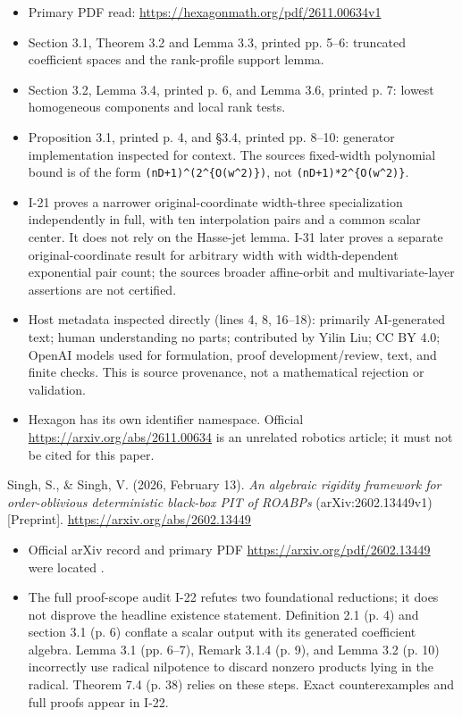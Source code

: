 \documentclass[11pt,a4paper]{article}
\providecommand{\tightlist}{\setlength{\itemsep}{0pt}\setlength{\parskip}{0pt}}
\theoremstyle{definition}\newtheorem{definition}{Definition}
\begin{document}
\begin{itemize}
\tightlist
\item
  Primary PDF read: \url{https://hexagonmath.org/pdf/2611.00634v1}
\item
  Section 3.1, Theorem 3.2 and Lemma 3.3, printed pp. 5--6: truncated
  coefficient spaces and the rank-profile support lemma.
\item
  Section 3.2, Lemma 3.4, printed p. 6, and Lemma 3.6, printed p. 7:
  lowest homogeneous components and local rank tests.
\item
  Proposition 3.1, printed p. 4, and §3.4, printed pp. 8--10: generator
  implementation inspected for context. The source\textquotesingle s
  fixed-width polynomial bound is of the form
  \texttt{(nD+1)\^{}(2\^{}\{O(w\^{}2)\})}, not
  \texttt{(nD+1)*2\^{}\{O(w\^{}2)\}}.
\item
  I-21 proves a narrower original-coordinate width-three specialization
  independently in full, with ten interpolation pairs and a common
  scalar center. It does not rely on the Hasse-jet lemma. I-31 later
  proves a separate original-coordinate result for arbitrary width with
  width-dependent exponential pair count; the source\textquotesingle s
  broader affine-orbit and multivariate-layer assertions are not
  certified.
\item
  Host metadata inspected directly (lines 4, 8, 16--18): primarily
  AI-generated text; human understanding no parts; contributed by Yilin
  Liu; CC BY 4.0; OpenAI models used for formulation, proof
  development/review, text, and finite checks. This is source
  provenance, not a mathematical rejection or validation.
\item
  Hexagon has its own identifier namespace. Official
  \url{https://arxiv.org/abs/2611.00634} is an unrelated robotics
  article; it must not be cited for this paper.
\end{itemize}

Singh, S., \& Singh, V. (2026, February 13). \emph{An algebraic rigidity
framework for order-oblivious deterministic black-box PIT of ROABPs}
(arXiv:2602.13449v1) {[}Preprint{]}.
\url{https://arxiv.org/abs/2602.13449}

\begin{itemize}
\tightlist
\item
  Official arXiv record and primary PDF
  \url{https://arxiv.org/pdf/2602.13449} were located .
\item
  The full proof-scope audit I-22 refutes two foundational reductions;
  it does not disprove the headline existence statement. Definition 2.1
  (p. 4) and section 3.1 (p. 6) conflate a scalar output with its
  generated coefficient algebra. Lemma 3.1 (pp. 6--7), Remark 3.1.4 (p.
  9), and Lemma 3.2 (p. 10) incorrectly use radical nilpotence to
  discard nonzero products lying in the radical. Theorem 7.4 (p. 38)
  relies on these steps. Exact counterexamples and full proofs appear in
  I-22.
\end{itemize}
\end{document}
